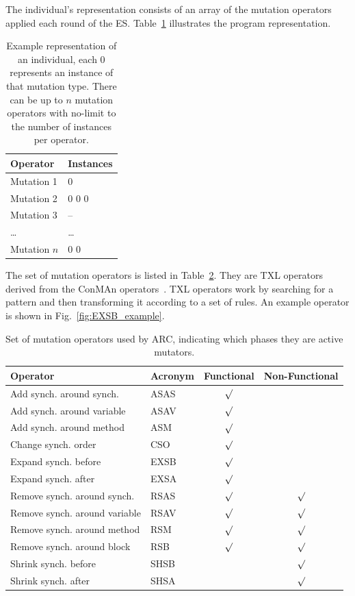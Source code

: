 \documentclass{llncs}
\begin{document}
The individual's representation consists of an array of the mutation operators
applied each round of the ES. Table~\ref{tbl:individual_representation}
illustrates the program representation.

\begin{table}[!h]
\begin{center}
\caption{Example representation of an individual, each 0 represents an instance
of that mutation type. There can be up to $n$ mutation operators with no-limit
to the number of instances per operator.}
\begin{tabular}{|l|l|}
\hline
\textbf{Operator} & \textbf{Instances}\\
\hline
Mutation 1 & 0\\
\hline
Mutation 2 & 0 0 0\\
\hline
Mutation 3 & --\\
\hline
\ldots & \ldots\\
\hline
Mutation $n$ & 0 0\\
\hline
\end{tabular}
\label{tbl:individual_representation}
\end{center}
\end{table}

The set of mutation operators is listed in Table~\ref{tbl:operators}. They are
TXL operators derived from the ConMAn operators~\cite{BCD06}. TXL operators
work by searching for a pattern and then transforming it according to a set of
rules. An example operator is shown in Fig.~\ref{fig:EXSB_example}.

\begin{table}
\caption{Set of mutation operators used by ARC, indicating which phases they
are active mutators.}
\begin{center}
\begin{tabular}{|l|l|c|c|}
\hline
\textbf{Operator} & \textbf{Acronym} & \textbf{Functional} & \textbf{Non-Functional}\\
\hline
Add synch. around synch. & ASAS & $\surd$ &\\
\hline
Add synch. around variable & ASAV & $\surd$ &\\
\hline
Add synch. around method & ASM & $\surd$ &\\
\hline
Change synch. order & CSO & $\surd$ &\\
\hline
Expand synch. before & EXSB & $\surd$ &\\
\hline
Expand synch. after & EXSA & $\surd$ &\\
\hline
Remove synch. around synch. & RSAS & $\surd$ & $\surd$\\
\hline
Remove synch. around variable & RSAV & $\surd$ & $\surd$\\
\hline
Remove synch. around method & RSM & $\surd$ & $\surd$\\
\hline
Remove synch. around block & RSB & $\surd$ & $\surd$\\
\hline
Shrink synch. before & SHSB & & $\surd$\\
\hline
Shrink synch. after & SHSA & & $\surd$\\
\hline
\end{tabular}
\label{tbl:operators}
\end{center}
\end{table}
\end{document}
